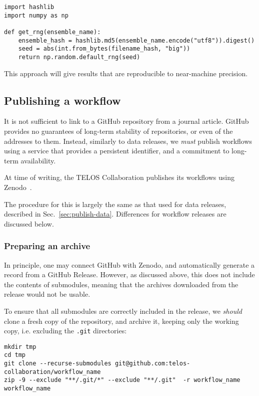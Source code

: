 \documentclass{article}
\newcommand\rfcword[1]{\emph{#1}\xspace}
\newcommand\must{\rfcword{must}}
\newcommand\should{\rfcword{should}}
\newcommand\filename[1]{\texttt{#1}\xspace}
\begin{document}
\begin{verbatim}
import hashlib
import numpy as np

def get_rng(ensemble_name):
    ensemble_hash = hashlib.md5(ensemble_name.encode("utf8")).digest()
    seed = abs(int.from_bytes(filename_hash, "big"))
    return np.random.default_rng(seed)
\end{verbatim}

This approach will give results that are reproducible to near-machine precision.



\subsection{Publishing a workflow}

It is not sufficient to link to a GitHub repository from a journal article.
GitHub provides no guarantees of long-term stability of repositories,
or even of the addresses to them.
Instead,
similarly to data releases,
we \must publish workflows using a service that provides a persistent identifier,
and a commitment to long-term availability.

At time of writing,
the TELOS Collaboration publishes its workflows using Zenodo~\cite{zenodo}.

The procedure for this is largely the same as that used for data releases,
described in Sec.~\ref{sec:publish-data}.
Differences for workflow releases are discussed below.

\subsubsection{Preparing an archive}

In principle,
one may connect GitHub with Zenodo,
and automatically generate a record from a GitHub Release.
However,
as discussed above,
this does not include the contents of submodules,
meaning that the archives downloaded from the release would not be usable.

To ensure that all submodules are correctly included in the release,
we \should clone a fresh copy of the repository,
and archive it,
keeping only the working copy,
i.e. excluding the \filename{.git} directories:

\begin{verbatim}
mkdir tmp
cd tmp
git clone --recurse-submodules git@github.com:telos-collaboration/workflow_name
zip -9 --exclude "**/.git/*" --exclude "**/.git"  -r workflow_name workflow_name
\end{verbatim}
\end{document}
